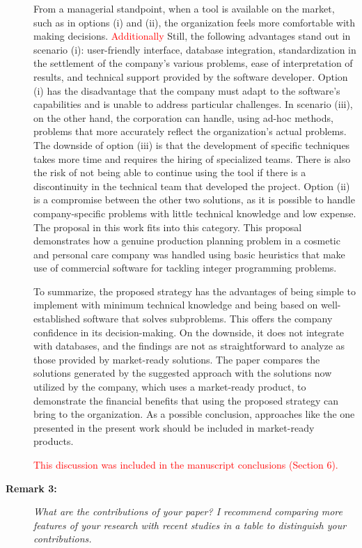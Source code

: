 \documentclass[11pt]{article}
\begin{document}
\begin{description}
From a managerial standpoint, when a tool is available on the market, such as in options (i) and (ii), the organization feels more comfortable with making decisions. \textcolor{red}{Additionally} Still, the following advantages stand out in scenario (i): user-friendly interface, database integration, standardization in the settlement of the company's various problems, ease of interpretation of results, and technical support provided by the software developer. Option (i) has the disadvantage that the company must adapt to the software's capabilities and is unable to address particular challenges. In scenario (iii), on the other hand, the corporation can handle, using ad-hoc methods, problems that more accurately reflect the organization's actual problems. The downside of option (iii) is that the development of specific techniques takes more time and requires the hiring of specialized teams. There is also the risk of not being able to continue using the tool if there is a discontinuity in the technical team that developed the project. Option (ii) is a compromise between the other two solutions, as it is possible to handle company-specific problems with little technical knowledge and low expense. The proposal in this work fits into this category. This proposal demonstrates how a genuine production planning problem in a cosmetic and personal care company was handled using basic heuristics that make use of commercial software for tackling integer programming problems.

To summarize, the proposed strategy has the advantages of being simple to implement with minimum technical knowledge and being based on well-established software that solves subproblems. This offers the company confidence in its decision-making. On the downside, it does not integrate with databases, and the findings are not as straightforward to analyze as those provided by market-ready solutions. The paper compares the solutions generated by the suggested approach with the solutions now utilized by the company, which uses a market-ready product, to demonstrate the financial benefits that using the proposed strategy can bring to the organization. As a possible conclusion, approaches like the one presented in the present work should be included in market-ready products.

\textcolor{red}{This discussion was included in the manuscript conclusions (Section 6).}

\item[\textbf{Remark 3:}] \textit{What are the contributions of your paper? I recommend comparing more features of your research with recent studies in a table to distinguish your contributions.}


\end{description}
\end{document}
